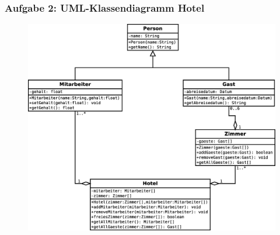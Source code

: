 \documentclass[11pt, a4paper, DIV=12]{scrartcl}
\begin{document}
\subsubsection*{Aufgabe 2: UML-Klassendiagramm \glqq Hotel\grqq}
\begin{figure}[h]
	\centering
	\includegraphics[width=\linewidth]{uebung01_hotel.eps}
\end{figure}
%


\end{document}

